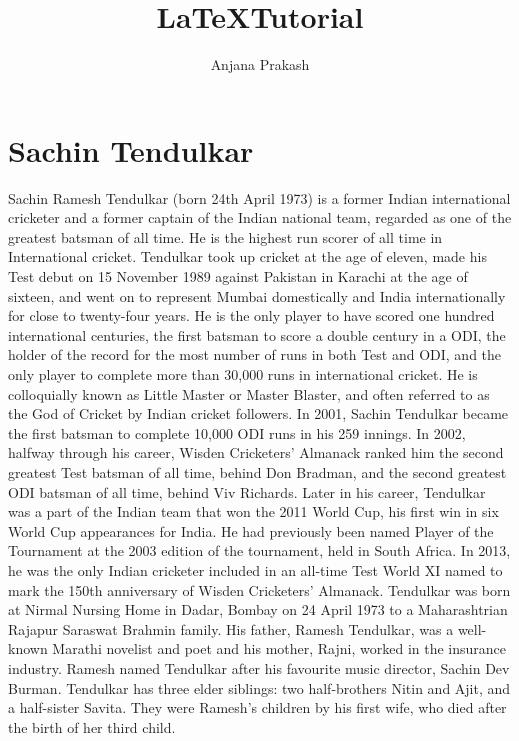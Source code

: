 \documentclass[a4paper,15pt]{report}
\begin{document}
\title{\LaTeX Tutorial}
\author{Anjana Prakash}
\maketitle
\tableofcontents
\listoffigures
\chapter{Sachin Tendulkar}
	

Sachin Ramesh Tendulkar (born 24th April 1973) is a former Indian international cricketer and a former captain of the Indian national team, regarded as one of the greatest batsman of all time. He is the highest run scorer of all time in International cricket. Tendulkar took up cricket at the age of eleven, made his Test debut on 15 November 1989 against Pakistan in Karachi at the age of sixteen, and went on to represent Mumbai domestically and India internationally for close to twenty-four years. He is the only player to have scored one hundred international centuries, the first batsman to score a double century in a ODI, the holder of the record for the most number of runs in both Test and ODI, and the only player to complete more than 30,000 runs in international cricket. He is colloquially known as Little Master or Master Blaster, and often referred to as the God of Cricket by Indian cricket followers. In 2001, Sachin Tendulkar became the first batsman to complete 10,000 ODI runs in his 259 innings. In 2002, halfway through his career, Wisden Cricketers' Almanack ranked him the second greatest Test batsman of all time, behind Don Bradman, and the second greatest ODI batsman of all time, behind Viv Richards. Later in his career, Tendulkar was a part of the Indian team that won the 2011 World Cup, his first win in six World Cup appearances for India. He had previously been named Player of the Tournament at the 2003 edition of the tournament, held in South Africa. In 2013, he was the only Indian cricketer included in an all-time Test World XI named to mark the 150th anniversary of Wisden Cricketers' Almanack.
Tendulkar was born at Nirmal Nursing Home in Dadar, Bombay on 24 April 1973 to a Maharashtrian Rajapur Saraswat Brahmin family. His father, Ramesh Tendulkar, was a well-known Marathi novelist and poet and his mother, Rajni, worked in the insurance industry. Ramesh named Tendulkar after his favourite music director, Sachin Dev Burman. Tendulkar has three elder siblings: two half-brothers Nitin and Ajit, and a half-sister Savita. They were Ramesh's children by his first wife, who died after the birth of her third child.
\end{document}

